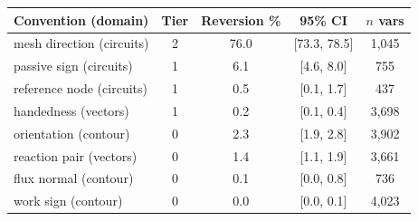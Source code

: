 \begin{tabular}{lcccc}
\toprule
Convention (domain) & Tier & Reversion \% & 95\% CI & $n$ vars \\
\midrule
mesh direction (circuits) & 2 & 76.0 & [73.3, 78.5] & 1,045 \\
passive sign (circuits) & 1 & 6.1 & [4.6, 8.0] & 755 \\
reference node (circuits) & 1 & 0.5 & [0.1, 1.7] & 437 \\
handedness (vectors) & 1 & 0.2 & [0.1, 0.4] & 3,698 \\
orientation (contour) & 0 & 2.3 & [1.9, 2.8] & 3,902 \\
reaction pair (vectors) & 0 & 1.4 & [1.1, 1.9] & 3,661 \\
flux normal (contour) & 0 & 0.1 & [0.0, 0.8] & 736 \\
work sign (contour) & 0 & 0.0 & [0.0, 0.1] & 4,023 \\
\bottomrule
\end{tabular}
